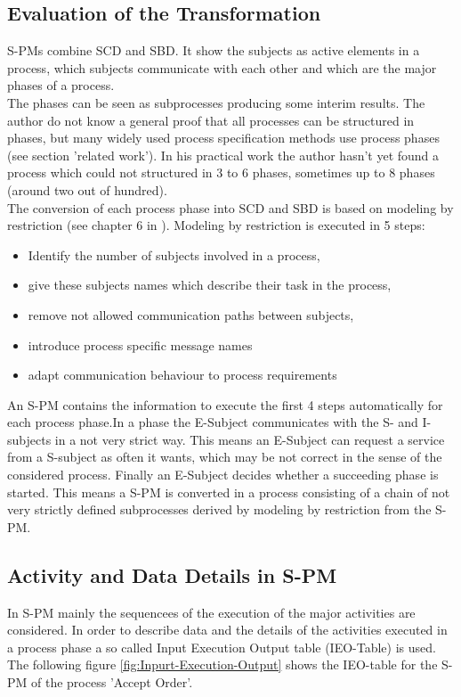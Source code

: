 \subsection{Evaluation of the Transformation}
S-PMs combine SCD and SBD. It show the subjects as active elements in a process, which subjects communicate with each other and which are the major phases of a process. \\

The phases can be seen as subprocesses producing some interim results. The author do not know a general proof that all processes can be structured in phases, but many widely used process specification methods use process phases (see section 'related work'). In his practical work the author hasn't yet found a process which could not structured in 3 to 6 phases, sometimes up to 8 phases (around two out of hundred).
\\
The conversion of each process phase into SCD and SBD is based on modeling by restriction (see chapter 6 in \cite{book:flei2011}). Modeling by restriction is executed in 5 steps:

\begin{itemize}
	\item Identify the number of subjects involved in a process,
	\item give these subjects names which describe their task in the process,
	\item remove not allowed communication paths between subjects,
	\item introduce process specific message names
	\item adapt communication behaviour to process requirements
\end{itemize}

An S-PM contains the information to execute the first 4 steps automatically for each process phase.In a phase the E-Subject communicates with the S- and I-subjects in a not very strict way. This means an E-Subject can request a service from a S-subject as often it wants, which may be not correct in the sense of the considered process. Finally an E-Subject decides whether a succeeding phase is started. This means a S-PM is converted in a process consisting of a chain of not very strictly defined subprocesses derived by modeling by restriction from the S-PM.


\subsection{Activity and Data Details in S-PM}
In S-PM mainly the sequencees of the execution of the major activities are considered.  In order to describe data and the details of the activities executed in a process phase a so called Input Execution Output table (IEO-Table) is used.  The following figure \ref{fig:Inpurt-Execution-Output} shows the IEO-table for the S-PM of the process 'Accept Order'.

